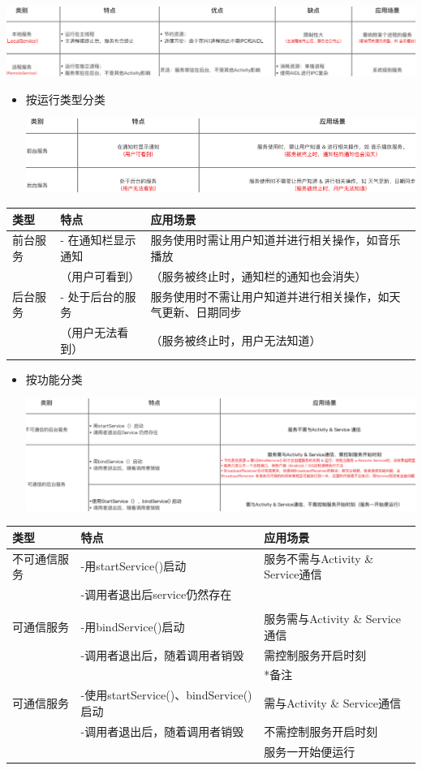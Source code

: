 \documentclass[9pt, b5paper]{article}
\begin{document}
\includegraphics[width=.9\linewidth]{./pic/location.png}
\begin{itemize}
\item 按运行类型分类

\includegraphics[width=.9\linewidth]{./pic/category.png}
\end{itemize}
\begin{center}
\begin{tabular}{lll}
\hline
类型 & 特点 & 应用场景\\
\hline
前台服务 & - 在通知栏显示通知 & 服务使用时需让用户知道并进行相关操作，如音乐播放\\
 & （用户可看到） & （服务被终止时，通知栏的通知也会消失）\\
\hline
后台服务 & - 处于后台的服务 & 服务使用时不需让用户知道并进行相关操作，如天气更新、日期同步\\
 & （用户无法看到） & （服务被终止时，用户无法知道）\\
\hline
\end{tabular}
\end{center}
\begin{itemize}
\item 按功能分类

\includegraphics[width=.9\linewidth]{./pic/function.png}
\end{itemize}
\begin{center}
\begin{tabular}{lll}
\hline
类型 & 特点 & 应用场景\\
\hline
不可通信服务 & -用startService()启动 & 服务不需与Activity \& Service通信\\
 & -调用者退出后service仍然存在 & \\
 &  & \\
\hline
可通信服务 & -用bindService()启动 & 服务需与Activity \& Service通信\\
 & -调用者退出后，随着调用者销毁 & 需控制服务开启时刻\\
 &  & *备注\\
\hline
可通信服务 & -使用startService()、bindService()启动 & 需与Activity \& Service通信\\
 & -调用者退出后，随着调用者销毁 & 不需控制服务开启时刻\\
 &  & 服务一开始便运行\\
\hline
\end{tabular}
\end{center}
\end{document}
